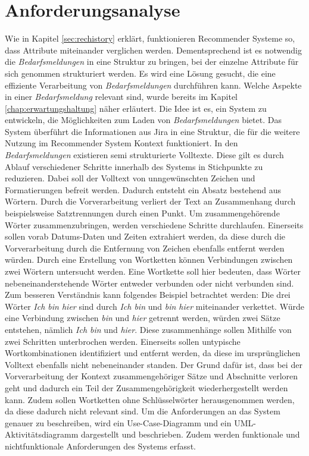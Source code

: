 \section{Anforderungsanalyse}
\label{sec:anforderungsanalyse}
Wie in Kapitel \ref{sec:rechistory} erklärt, funktionieren Recommender Systeme so, dass Attribute miteinander verglichen werden. Dementsprechend ist es notwendig die \emph{Bedarfsmeldungen} in eine Struktur zu bringen, bei der einzelne Attribute für sich genommen strukturiert werden. Es wird eine Lösung gesucht, die eine effiziente Verarbeitung von \emph{Bedarfsmeldungen} durchführen kann. Welche Aspekte in einer \emph{Bedarfsmeldung} relevant sind, wurde bereits im Kapitel \ref{chap:erwartungshaltung} näher erläutert. Die Idee ist es, ein System zu entwickeln, die Möglichkeiten zum Laden von \emph{Bedarfsmeldungen} bietet. Das System überführt die Informationen aus Jira in eine Struktur, die für die weitere Nutzung im Recommender System Kontext funktioniert. In den \emph{Bedarfsmeldungen} existieren semi strukturierte Volltexte. Diese gilt es durch Ablauf verschiedener Schritte innerhalb des Systems in Stichpunkte zu reduzieren. Dabei soll der Volltext von unngewünschten Zeichen und Formatierungen befreit werden. Dadurch entsteht ein Absatz bestehend aus Wörtern. Durch die Vorverarbeitung verliert der Text an Zusammenhang durch beispielsweise Satztrennungen durch einen Punkt. Um zusammengehörende Wörter zusammenzubringen, werden verschiedene Schritte durchlaufen. Einerseits sollen vorab Datums-Daten und Zeiten extrahiert werden, da diese durch die Vorverarbeitung durch die Entfernung von Zeichen ebenfalls entfernt werden würden. Durch eine Erstellung von Wortketten können Verbindungen zwischen zwei Wörtern untersucht werden. Eine Wortkette soll hier bedeuten, dass Wörter nebeneinanderstehende Wörter entweder verbunden oder nicht verbunden sind. Zum besseren Verständnis kann folgendes Beispiel betrachtet werden: Die drei Wörter \emph{Ich bin hier} sind durch \emph{Ich bin} und \emph{bin hier} miteinander verkettet. Würde eine Verbindung zwischen \emph{bin} und \emph{hier} getrennt werden, würden zwei Sätze entstehen, nämlich \emph{Ich bin} und \emph{hier}. Diese zusammenhänge sollen Mithilfe von zwei Schritten unterbrochen werden. Einerseits sollen untypische Wortkombinationen identifiziert und entfernt werden, da diese im ursprünglichen Volltext ebenfalls nicht nebeneinander standen. Der Grund dafür ist, dass bei der Vorverarbeitung der Kontext zusammengehöriger Sätze und Abschnitte verloren geht und dadurch ein Teil der Zusammengehörigkeit wiederhergestellt werden kann. Zudem sollen Wortketten ohne Schlüsselwörter herausgenommen werden, da diese dadurch nicht relevant sind. Um die Anforderungen an das System genauer zu beschreiben, wird ein Use-Case-Diagramm und ein UML-Aktivitätsdiagramm dargestellt und beschrieben. Zudem werden funktionale und nichtfunktionale Anforderungen des Systems erfasst.
